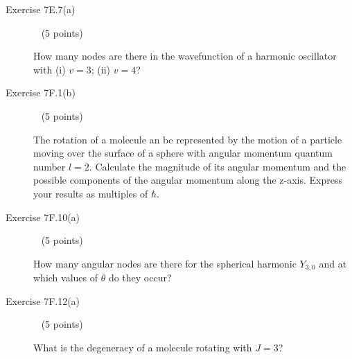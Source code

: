 \documentclass[10pt, letterpaper]{memoir}
\begin{document}
\begin{description}
	\vspace{5em}
	\item [Exercise 7E.7(a)] ~ (5 points)
	
	How many nodes are there in the wavefunction of a harmonic oscillator with (i) $v=3$; (ii) $v=4$?
	
	\vspace{5em}
	\item [Exercise 7F.1(b)] ~ (5 points)
	
	The rotation of a molecule an be represented by the motion of a particle moving over the surface of a sphere with angular momentum quantum number $l=2$. Calculate the magnitude of its angular momentum and the possible components of the angular momentum along the z-axis. Express your results as multiples of $\hbar$.
	
	\vspace{5em}
	\item [Exercise 7F.10(a)] ~ (5 points)
	
	How many angular nodes are there for the spherical harmonic $Y_{3,0}$ and at which values of $\theta$ do they occur?
	
	\vspace{5em}
	\item [Exercise 7F.12(a)] ~ (5 points)
	
	What is the degeneracy of a molecule rotating with $J=3$?
	
\end{description}
\end{document}
